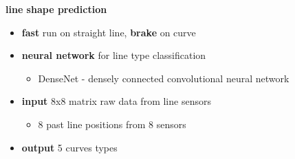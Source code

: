 \documentclass[xcolor=dvipsnames]{beamer}
\begin{document}
\begin{frame}{\bf line shape prediction}

\begin{itemize}
    \item {\bf fast} run on straight line, {\bf brake} on curve
    \item {\bf neural network} for line type classification
        \begin{itemize}
            \item DenseNet - densely connected convolutional neural network
        \end{itemize}
    \item {\bf input} 8x8 matrix raw data from line sensors
        \begin{itemize}
            \item 8 past line positions from 8 sensors
        \end{itemize}
    \item {\bf output} 5 curves types
\end{itemize}


\centering


\end{frame}
\end{document}
